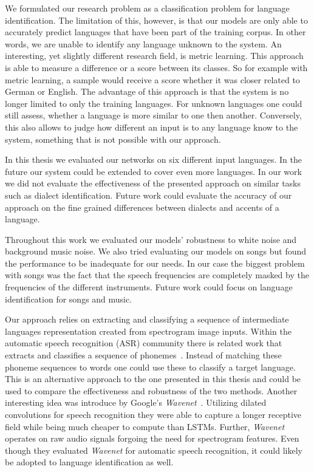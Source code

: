 We formulated our research problem as a classification problem for language identification. The limitation of this, however, is that our models are only able to accurately predict languages that have been part of the training corpus. In other words, we are unable to identify any language unknown to the system. An interesting, yet slightly different research field, is metric learning. This approach is able to measure a difference or a score between its classes. So for example with metric learning, a sample would receive a score whether it was closer related to German or English. The advantage of this approach is that the system is no longer limited to only the training languages. For unknown languages one could still assess, whether a language is more similar to one then another. Conversely, this also allows to judge how different an input is to any language know to the system, something that is not possible with our approach.

In this thesis we evaluated our networks on six different input languages. In the future our system could be extended to cover even more languages. In our work we did not evaluate the effectiveness of the presented approach on similar tasks such as dialect identification. Future work could evaluate the accuracy of our approach on the fine grained differences between dialects and accents of a language.

Throughout this work we evaluated our models' robustness to white noise and background music noise. We also tried evaluating our models on songs but found the performance to be inadequate for our needs. In our case the biggest problem with songs was the fact that the speech frequencies are completely masked by the frequencies of the different instruments. Future work could focus on language identification for songs and music.

Our approach relies on extracting and classifying a sequence of intermediate languages representation created from spectrogram image inputs. Within the automatic speech recognition (ASR) community there is related work that extracts and classifies a sequence of phonemes~\cite{song2015end}. Instead of matching these phoneme sequences to words one could use these to classify a target language. This is an alternative approach to the one presented in this thesis and could be used to compare the effectiveness and robustness of the two methods. Another interesting idea was introduce by Google's \emph{Wavenet}~\cite{van2016wavenet}. Utilizing dilated convolutions for speech recognition they were able to capture a longer receptive field while being much cheaper to compute than LSTMs. Further, \emph{Wavenet} operates on raw audio signals forgoing the need for spectrogram features.  Even though they evaluated \emph{Wavenet} for automatic speech recognition, it could likely be adopted to language identification as well. 

